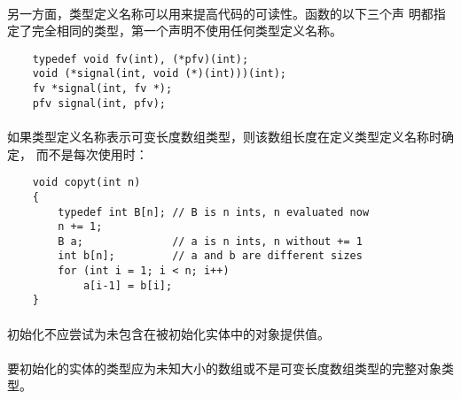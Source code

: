 \paragraph{}
\ex 另一方面，类型定义名称可以用来提高代码的可读性。函数的以下三个声
明都指定了完全相同的类型，第一个声明不使用任何类型定义名称。
\begin{lstlisting}
    typedef void fv(int), (*pfv)(int);
    void (*signal(int, void (*)(int)))(int);
    fv *signal(int, fv *);
    pfv signal(int, pfv);
\end{lstlisting}

\paragraph{}
\ex 如果类型定义名称表示可变长度数组类型，则该数组长度在定义类型定义名称时确定，
而不是每次使用时：
\begin{lstlisting}
    void copyt(int n)
    {
        typedef int B[n]; // B is n ints, n evaluated now
        n += 1;
        B a;              // a is n ints, n without += 1
        int b[n];         // a and b are different sizes
        for (int i = 1; i < n; i++)
            a[i-1] = b[i];
    }
\end{lstlisting}

\syntax
\paragraph{}

\constraint
\paragraph{}
初始化不应尝试为未包含在被初始化实体中的对象提供值。

\paragraph{}
要初始化的实体的类型应为未知大小的数组或不是可变长度数组类型的完整对象类型。

